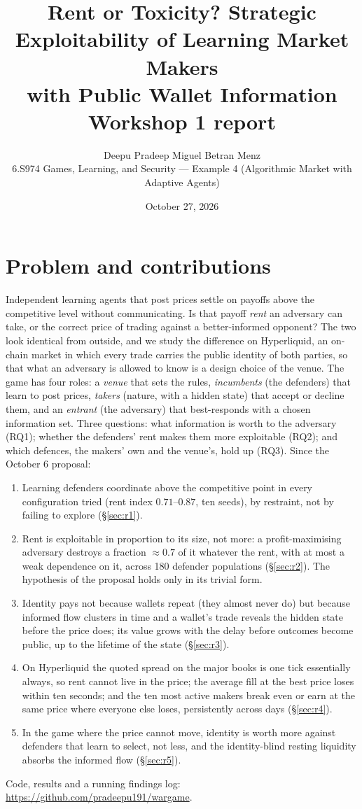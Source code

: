 \documentclass[10pt]{article}
\title{\vspace{-1.2em}\textbf{Rent or Toxicity? Strategic Exploitability of Learning Market Makers\\ with Public Wallet Information}\\[0.2em]\large Workshop 1 report}
\author{Deepu Pradeep \quad Miguel Betran Menz\\
\normalsize 6.S974 Games, Learning, and Security --- Example 4 (Algorithmic Market with Adaptive Agents)}
\date{October 27, 2026}
\begin{document}
\maketitle
\vspace{-1.5em}

\section{Problem and contributions}
Independent learning agents that post prices settle on payoffs above the competitive level without communicating. Is that payoff \emph{rent} an adversary can take, or the correct price of trading against a better-informed opponent? The two look identical from outside, and we study the difference on Hyperliquid, an on-chain market in which every trade carries the public identity of both parties, so that what an adversary is allowed to know is a design choice of the venue. The game has four roles: a \emph{venue} that sets the rules, \emph{incumbents} (the defenders) that learn to post prices, \emph{takers} (nature, with a hidden state) that accept or decline them, and an \emph{entrant} (the adversary) that best-responds with a chosen information set. Three questions: what information is worth to the adversary (RQ1); whether the defenders' rent makes them more exploitable (RQ2); and which defences, the makers' own and the venue's, hold up (RQ3). Since the October 6 proposal:
\begin{enumerate}
\item Learning defenders coordinate above the competitive point in every configuration tried (rent index $0.71$--$0.87$, ten seeds), by restraint, not by failing to explore (\S\ref{sec:r1}).
\item Rent is exploitable in proportion to its size, not more: a profit-maximising adversary destroys a fraction $\approx0.7$ of it whatever the rent, with at most a weak dependence on it, across 180 defender populations (\S\ref{sec:r2}). The hypothesis of the proposal holds only in its trivial form.
\item Identity pays not because wallets repeat (they almost never do) but because informed flow clusters in time and a wallet's trade reveals the hidden state before the price does; its value grows with the delay before outcomes become public, up to the lifetime of the state (\S\ref{sec:r3}).
\item On Hyperliquid the quoted spread on the major books is one tick essentially always, so rent cannot live in the price; the average fill at the best price loses within ten seconds; and the ten most active makers break even or earn at the same price where everyone else loses, persistently across days (\S\ref{sec:r4}).
\item In the game where the price cannot move, identity is worth more against defenders that learn to select, not less, and the identity-blind resting liquidity absorbs the informed flow (\S\ref{sec:r5}).
\end{enumerate}
Code, results and a running findings log: \url{https://github.com/pradeepu191/wargame}.
\end{document}
